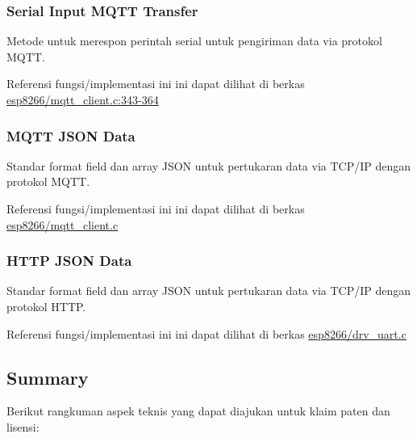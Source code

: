 \documentclass[12pt,]{article}
\begin{document}
	\subsubsection{Serial Input MQTT Transfer}
	
	Metode untuk merespon perintah serial untuk pengiriman data via protokol MQTT.
	
	Referensi fungsi/implementasi ini ini dapat dilihat di berkas
	\href{https://github.com/VibrasticLab/pikoakustik/blob/stm32f401re_3pin/esp8266/user/drv_uart.c#L343-L364}{esp8266/mqtt\_client.c:343-364}

	\subsubsection{MQTT JSON Data}
	
	Standar format field dan array JSON untuk pertukaran data via TCP/IP dengan protokol MQTT.
	
	Referensi fungsi/implementasi ini ini dapat dilihat di berkas
	\href{https://github.com/VibrasticLab/pikoakustik/blob/stm32f401re_3pin/esp8266/user/mqtt\_client.c}{esp8266/mqtt\_client.c}
	
	\subsubsection{HTTP JSON Data}
	
	Standar format field dan array JSON untuk pertukaran data via TCP/IP dengan protokol HTTP.
	
	Referensi fungsi/implementasi ini ini dapat dilihat di berkas
	\href{https://github.com/VibrasticLab/pikoakustik/blob/stm32f401re_3pin/esp8266/user/drv\_uart.c}{esp8266/drv\_uart.c}
	
	\newpage
	\subsection{Summary}
	
	Berikut rangkuman aspek teknis yang dapat diajukan untuk klaim paten dan lisensi:
	
\end{document}
